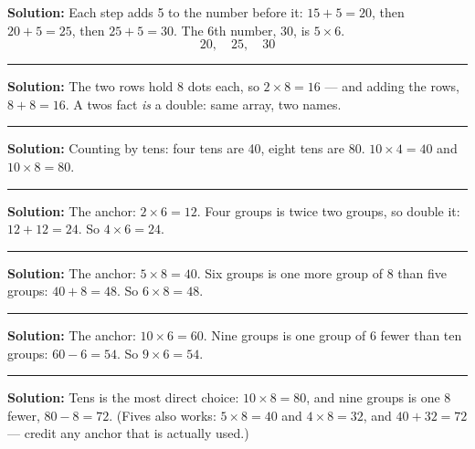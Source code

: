 \documentclass[12pt]{article}
\begin{document}



\textbf{Solution:} Each step adds 5 to the number before it: $15 + 5 = 20$, then $20 + 5 = 25$, then $25 + 5 = 30$. The 6th number, 30, is $5 \times 6$.
\[ \boxed{20,\quad 25,\quad 30} \]

\noindent\rule{\linewidth}{0.2pt}


\textbf{Solution:} The two rows hold 8 dots each, so $2 \times 8 = 16$ --- and adding the rows, $8 + 8 = 16$. A twos fact \emph{is} a double: same array, two names. 

\noindent\rule{\linewidth}{0.2pt}


\textbf{Solution:} Counting by tens: four tens are 40, eight tens are 80. $10 \times 4 = 40$ and $10 \times 8 = 80$. 

\noindent\rule{\linewidth}{0.2pt}


\textbf{Solution:} The anchor: $2 \times 6 = 12$. Four groups is twice two groups, so double it: $12 + 12 = 24$. So $4 \times 6 = 24$. 

\noindent\rule{\linewidth}{0.2pt}


\textbf{Solution:} The anchor: $5 \times 8 = 40$. Six groups is one more group of 8 than five groups: $40 + 8 = 48$. So $6 \times 8 = 48$. 

\noindent\rule{\linewidth}{0.2pt}


\textbf{Solution:} The anchor: $10 \times 6 = 60$. Nine groups is one group of 6 fewer than ten groups: $60 - 6 = 54$. So $9 \times 6 = 54$. 

\noindent\rule{\linewidth}{0.2pt}


\textbf{Solution:} Tens is the most direct choice: $10 \times 8 = 80$, and nine groups is one 8 fewer, $80 - 8 = 72$. (Fives also works: $5 \times 8 = 40$ and $4 \times 8 = 32$, and $40 + 32 = 72$ --- credit any anchor that is actually used.) 
\end{document}
